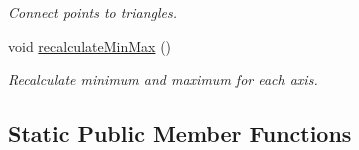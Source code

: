 \begin{DoxyCompactItemize}
\begin{DoxyCompactList}\small\item\em Connect points to triangles. \end{DoxyCompactList}\item 
\hypertarget{class_mesh_a06ac6e1eb7bd66f5c85c0aab3e805500}{void \hyperlink{class_mesh_a06ac6e1eb7bd66f5c85c0aab3e805500}{recalculate\+Min\+Max} ()}\label{class_mesh_a06ac6e1eb7bd66f5c85c0aab3e805500}

\begin{DoxyCompactList}\small\item\em Recalculate minimum and maximum for each axis. \end{DoxyCompactList}\end{DoxyCompactItemize}
\subsection*{Static Public Member Functions}
